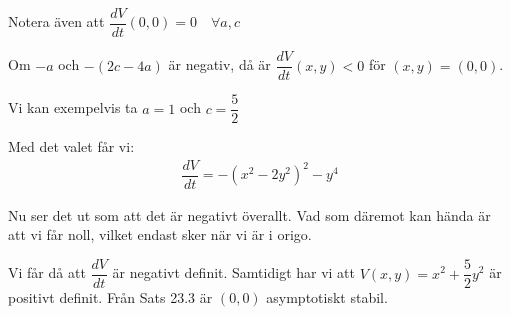 \noindent Notera även att $\dfrac{dV}{dt}(0,0)=0\quad\forall a,c$\par
\noindent Om $-a$ och $-(2c-4a)$ är negativ, då är $\dfrac{dV}{dt}(x,y)<0$ för $(x,y)=(0,0)$.\par
\noindent Vi kan exempelvis ta $a=1$ och $c=\dfrac{5}{2}$
\par\bigskip
\noindent Med det valet får vi:
\begin{equation*}
  \begin{gathered}
    \dfrac{dV}{dt} = -(x^2-2y^2)^2-y^4
  \end{gathered}
\end{equation*}\par
\noindent Nu ser det ut som att det är negativt överallt. Vad som däremot kan hända är att vi får noll, vilket endast sker när vi är i origo.\par
\noindent Vi får då att $\dfrac{dV}{dt}$ är negativt definit. Samtidigt har vi att $V(x,y) = x^2+\dfrac{5}{2}y^2$ är positivt definit. Från Sats 23.3 är $(0,0)$ asymptotiskt stabil.

